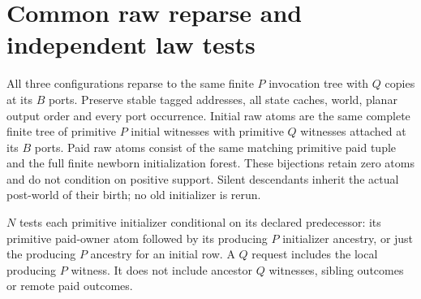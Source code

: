 \documentclass[11pt]{article}\usepackage{amsmath,amssymb,amsthm,geometry}\geometry{margin=1in}
\begin{document}
\section{Common raw reparse and independent law tests}
All three configurations reparse to the same finite $P$ invocation tree with $Q$ copies at its $B$ ports. Preserve stable tagged addresses, all state caches, world, planar output order and every port occurrence. Initial raw atoms are the same complete finite tree of primitive $P$ initial witnesses with primitive $Q$ witnesses attached at its $B$ ports. Paid raw atoms consist of the same matching primitive paid tuple and the full finite newborn initialization forest. These bijections retain zero atoms and do not condition on positive support. Silent descendants inherit the actual post-world of their birth; no old initializer is rerun.

$N$ tests each primitive initializer conditional on its declared predecessor: its primitive paid-owner atom followed by its producing $P$ initializer ancestry, or just the producing $P$ ancestry for an initial row. A $Q$ request includes the local producing $P$ witness. It does not include ancestor $Q$ witnesses, sibling outcomes or remote paid outcomes.
\end{document}
